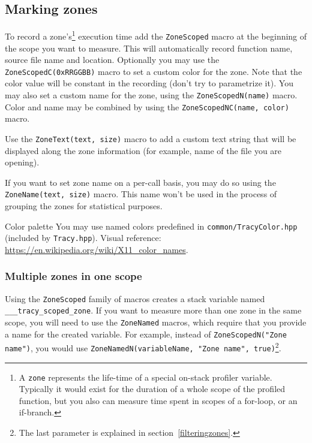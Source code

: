 \documentclass[hidelinks,titlepage,a4paper]{article}
\begin{document}
\subsection{Marking zones}

To record a zone's\footnote{A \texttt{zone} represents the life-time of a special on-stack profiler variable. Typically it would exist for the duration of a whole scope of the profiled function, but you also can measure time spent in scopes of a for-loop, or an if-branch.} execution time add the \texttt{ZoneScoped} macro at the beginning of the scope you want to measure. This will automatically record function name, source file name and location. Optionally you may use the \texttt{ZoneScopedC(0xRRGGBB)} macro to set a custom color for the zone. Note that the color value will be constant in the recording (don't try to parametrize it). You may also set a custom name for the zone, using the \texttt{ZoneScopedN(name)} macro. Color and name may be combined by using the \texttt{ZoneScopedNC(name, color)} macro.

Use the \texttt{ZoneText(text, size)} macro to add a custom text string that will be displayed along the zone information (for example, name of the file you are opening).

If you want to set zone name on a per-call basis, you may do so using the \texttt{ZoneName(text, size)} macro. This name won't be used in the process of grouping the zones for statistical purposes.

\begin{bclogo}[
noborder=true,
couleur=black!5,
logo=\bclampe
]{Color palette}
You may use named colors predefined in \texttt{common/TracyColor.hpp} (included by \texttt{Tracy.hpp}). Visual reference: \url{https://en.wikipedia.org/wiki/X11_color_names}.
\end{bclogo}

\subsubsection{Multiple zones in one scope}
\label{multizone}

Using the \texttt{ZoneScoped} family of macros creates a stack variable named \texttt{\_\_\_tracy\_scoped\_zone}. If you want to measure more than one zone in the same scope, you will need to use the \texttt{ZoneNamed} macros, which require that you provide a name for the created variable. For example, instead of \texttt{ZoneScopedN("Zone name")}, you would use \texttt{ZoneNamedN(variableName, "Zone name", true)}\footnote{The last parameter is explained in section~\ref{filteringzones}.}.
\end{document}
